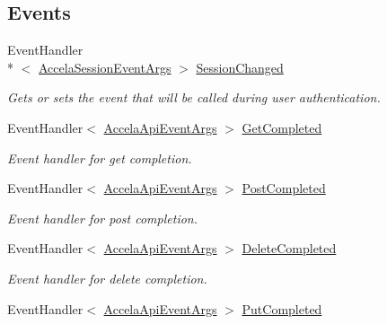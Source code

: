 \subsection*{Events}
\begin{DoxyCompactItemize}
\item 
Event\+Handler\\*
$<$ \hyperlink{class_accela_1_1_windows_store_s_d_k_1_1_accela_session_event_args}{Accela\+Session\+Event\+Args} $>$ \hyperlink{class_accela_1_1_windows_store_s_d_k_1_1_accela_s_d_k_a9217603b8d65f3b1424073df8c69dd1d}{Session\+Changed}
\begin{DoxyCompactList}\small\item\em Gets or sets the event that will be called during user authentication. \end{DoxyCompactList}\item 
Event\+Handler$<$ \hyperlink{class_accela_1_1_windows_store_s_d_k_1_1_accela_api_event_args}{Accela\+Api\+Event\+Args} $>$ \hyperlink{class_accela_1_1_windows_store_s_d_k_1_1_accela_s_d_k_a592b561cd868b1bedef095647a9b1b93}{Get\+Completed}
\begin{DoxyCompactList}\small\item\em Event handler for get completion. \end{DoxyCompactList}\item 
Event\+Handler$<$ \hyperlink{class_accela_1_1_windows_store_s_d_k_1_1_accela_api_event_args}{Accela\+Api\+Event\+Args} $>$ \hyperlink{class_accela_1_1_windows_store_s_d_k_1_1_accela_s_d_k_abb051213f540d79972279d61a9f69304}{Post\+Completed}
\begin{DoxyCompactList}\small\item\em Event handler for post completion. \end{DoxyCompactList}\item 
Event\+Handler$<$ \hyperlink{class_accela_1_1_windows_store_s_d_k_1_1_accela_api_event_args}{Accela\+Api\+Event\+Args} $>$ \hyperlink{class_accela_1_1_windows_store_s_d_k_1_1_accela_s_d_k_aee12c0ad198a72d8b917f2e953e87157}{Delete\+Completed}
\begin{DoxyCompactList}\small\item\em Event handler for delete completion. \end{DoxyCompactList}\item 
Event\+Handler$<$ \hyperlink{class_accela_1_1_windows_store_s_d_k_1_1_accela_api_event_args}{Accela\+Api\+Event\+Args} $>$ \hyperlink{class_accela_1_1_windows_store_s_d_k_1_1_accela_s_d_k_aed2d9e7a18c0e4dcb3cd1178883596eb}{Put\+Completed}

\end{DoxyCompactItemize}
